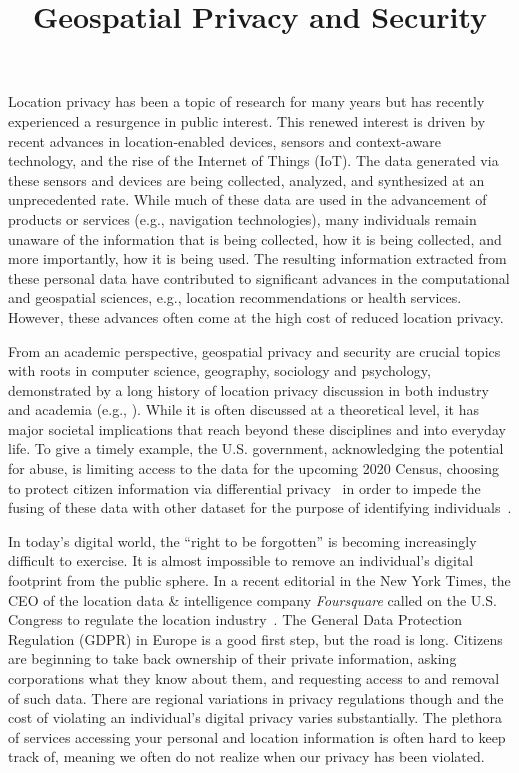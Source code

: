 \documentclass{josised}
\begin{document}

\title{Geospatial Privacy and Security}

\maketitle

	\thispagestyle{titlepage}

Location privacy has been a topic of research for many years but has recently experienced a resurgence in public interest. This renewed interest is driven by recent advances in location-enabled devices, sensors and context-aware technology, and the rise of the Internet of Things (IoT). The data generated via these sensors and devices are being collected, analyzed, and synthesized at an unprecedented rate. While much of these data are used in the advancement of products or services (e.g., navigation technologies), many individuals remain unaware of the information that is being collected, how it is being collected, and more importantly, how it is being used. The resulting information extracted from these personal data have contributed to significant advances in the computational and geospatial sciences, e.g., location recommendations or health services. However, these advances often come at the high cost of reduced location privacy.

From an academic perspective, geospatial privacy and security are crucial topics with roots in computer science, geography, sociology and psychology, demonstrated by a long history of location privacy discussion in both industry and academia (e.g., \cite{dobson2003geoslavery,duckham2005formal,krumm2009survey,armstrong2005geographic,kessler2018geoprivacy}).  While it is often discussed at a theoretical level, it has major societal implications that reach beyond these disciplines and into everyday life. To give a timely example, the U.S. government, acknowledging the potential for abuse, is limiting access to the data for the upcoming 2020 Census, choosing to protect citizen information via differential privacy~\cite{dwork2011differential} in order to impede the fusing of these data with other dataset for the purpose of identifying individuals~\cite{census2020}.

In today’s digital world, the ``right to be forgotten'' is becoming increasingly difficult to exercise. It is almost impossible to remove an individual's digital footprint from the public sphere. In a recent editorial in the New York Times, the CEO of the location data \& intelligence company \textit{Foursquare} called on the U.S. Congress to regulate the location industry~\cite{glueck2019}. The General Data Protection Regulation (GDPR) in Europe is a good first step, but the road is long.  Citizens are beginning to take back ownership of their private information, asking corporations what they know about them, and requesting access to and removal of such data. There are regional variations in privacy regulations though and the cost of violating an individual’s digital privacy varies substantially.  The plethora of services accessing your personal and location information is often hard to keep track of, meaning we often do not realize when our privacy has been violated.
\end{document}
